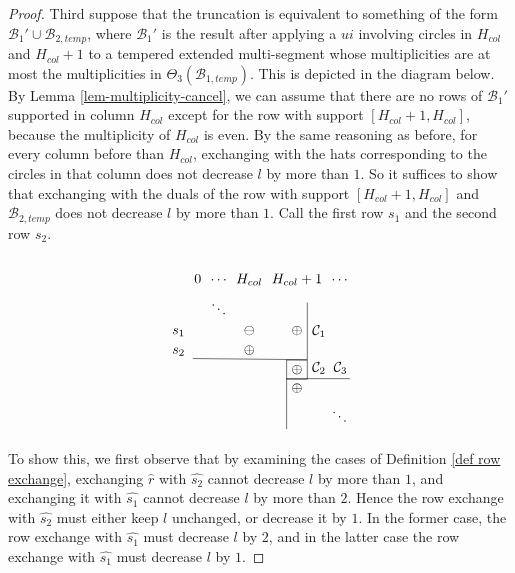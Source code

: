 \documentclass[11pt,letterpaper]{amsart}
\newcommand{\BB}{\mathcal{B}}
\newcommand{\CC}{\mathcal{C}}
\numberwithin{equation}{section}
\begin{document}
\begin{proof}
    Third suppose that the truncation is equivalent to something of the form $\BB_1' \cup \BB_{2, temp}$, where $\BB_1'$ is the result after applying a $ui$ involving circles in $H_{col}$ and $H_{col}+1$ to a tempered extended multi-segment whose multiplicities are at most the multiplicities in $\Theta_3(\BB_{1, temp})$. This is depicted in the diagram below. By Lemma \ref{lem-multiplicity-cancel}, we can assume that there are no rows of $\BB_1'$ supported in column $H_{col}$ except for the row with support $[H_{col}+1, H_{col}]$, because the multiplicity of $H_{col}$ is even. By the same reasoning as before, for every column before than $H_{col}$, exchanging with the hats corresponding to the circles in that column does not decrease $l$ by more than $1$. So it suffices to show that exchanging with the duals of the row with support $[H_{col}+1, H_{col}]$ and $\BB_{2, temp}$ does not decrease $l$ by more than $1$. Call the first row $s_1$ and the second row $s_2$.
    \[\begin{tikzpicture}[baseline=(current bounding box.north)]
      \matrix (m) [matrix of math nodes, nodes in empty cells] {
        & 0 & \cdots & H_{col} & H_{col} + 1 & \cdots\\
        & & \ddots &  & \phantom{\oplus} & \\
        s_1 & & & \ominus & \oplus & \\
        s_2 & & & \oplus & \phantom{\oplus} & \\
        & & & & \oplus & \\
        & & & & \oplus & \phantom{\oplus} \\
        & & & & \phantom{\oplus}& \ddots \\
      } ;
      \draw (m-4-2.south west) -- (m-4-5.south east);
      \draw (m-4-5.south east) -- (m-2-5.north east) node[pos=0.5, right] {$\CC_1$};
      \draw (m-6-5.north west) -- (m-6-6.north east) node[pos=0.85, above] {$\CC_3$} node[pos=0.51, above] {$\CC_2$};
      \draw (m-6-5.north west) -- (m-7-5.south west);
      \draw (m-5-5.north west) rectangle (m-5-5.south east);
    \end{tikzpicture}\]
    
    To show this, we first observe that by examining the cases of Definition \ref{def row exchange}, exchanging $\widehat{r}$ with $\widehat{s_2}$ cannot decrease $l$ by more than $1$, and exchanging it with $\widehat{s_1}$ cannot decrease $l$ by more than $2$. Hence the row exchange with $\widehat{s_2}$ must either keep $l$ unchanged, or decrease it by $1$. In the former case, the row exchange with $\widehat{s_1}$ must decrease $l$ by $2$, and in the latter case the row exchange with $\widehat{s_1}$ must decrease $l$ by $1$.


\end{proof}
\end{document}
